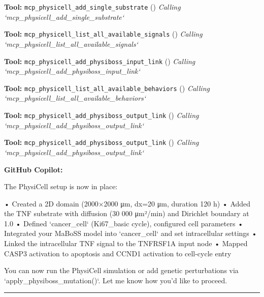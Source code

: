 \documentclass[11pt,a4paper]{article}
\begin{document}
\begin{toolokbox}
\textbf{Tool:} \texttt{mcp\_physicell\_add\_single\_substrate} (\checkmark)
\textit{Calling `mcp\_physicell\_add\_single\_substrate`}
\end{toolokbox}
\begin{toolokbox}
\textbf{Tool:} \texttt{mcp\_physicell\_list\_all\_available\_signals} (\checkmark)
\textit{Calling `mcp\_physicell\_list\_all\_available\_signals`}
\end{toolokbox}
\begin{toolokbox}
\textbf{Tool:} \texttt{mcp\_physicell\_add\_physiboss\_input\_link} (\checkmark)
\textit{Calling `mcp\_physicell\_add\_physiboss\_input\_link`}
\end{toolokbox}
\begin{toolokbox}
\textbf{Tool:} \texttt{mcp\_physicell\_list\_all\_available\_behaviors} (\checkmark)
\textit{Calling `mcp\_physicell\_list\_all\_available\_behaviors`}
\end{toolokbox}
\begin{toolokbox}
\textbf{Tool:} \texttt{mcp\_physicell\_add\_physiboss\_output\_link} (\checkmark)
\textit{Calling `mcp\_physicell\_add\_physiboss\_output\_link`}
\end{toolokbox}
\begin{toolokbox}
\textbf{Tool:} \texttt{mcp\_physicell\_add\_physiboss\_output\_link} (\checkmark)
\textit{Calling `mcp\_physicell\_add\_physiboss\_output\_link`}
\end{toolokbox}
\begin{copilotbox}
\textbf{GitHub Copilot:}

The PhysiCell setup is now in place:

• Created a 2D domain (2000×2000 μm, dx=20 μm, duration 120 h)  
• Added the TNF substrate with diffusion (30 000 μm²/min) and Dirichlet boundary at 1.0  
• Defined `cancer\_cell` (Ki67\_basic cycle), configured cell parameters  
• Integrated your MaBoSS model into `cancer\_cell` and set intracellular settings  
• Linked the intracellular TNF signal to the TNFRSF1A input node  
• Mapped CASP3 activation to apoptosis and CCND1 activation to cell-cycle entry

You can now run the PhysiCell simulation or add genetic perturbations via `apply\_physiboss\_mutation()`. Let me know how you’d like to proceed.

\end{copilotbox}
\bigskip\hrule\bigskip
\end{document}
